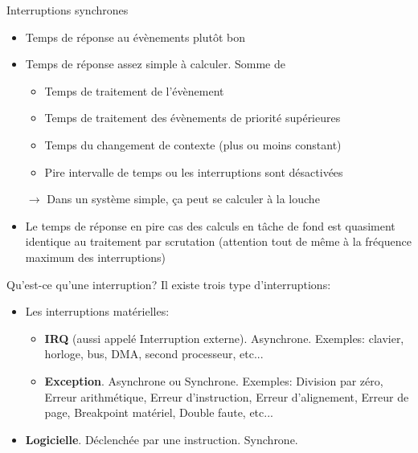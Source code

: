 \begin{frame}{Interruptions synchrones}
  \begin{itemize}
  \item Temps de réponse au évènements plutôt bon
  \item Temps de réponse assez simple à calculer. Somme de
    \begin{itemize}
    \item Temps de traitement de l'évènement
    \item Temps de traitement des évènements de priorité supérieures
    \item Temps du changement de contexte (plus ou moins constant)
    \item Pire intervalle de temps ou les interruptions sont désactivées
    \end{itemize}
  \item[$\rightarrow$] Dans  un système simple, ça peut  se calculer à
    la louche
  \item Le  temps de réponse en pire  cas des calculs en  tâche de fond
    est quasiment  identique au traitement  par scrutation (attention
    tout de même à la fréquence maximum des interruptions)
  \end{itemize}
\end{frame}

\begin{frame}{Qu'est-ce qu'une interruption?}
  Il existe trois type d'interruptions:
  \begin{itemize}
  \item Les interruptions matérielles:
    \begin{itemize}
    \item   \textbf{IRQ}   (aussi   appelé   Interruption   externe).
      Asynchrone.   Exemples:  clavier,   horloge,  bus,  DMA,  second
      processeur, etc...
    \item  \textbf{Exception}.   Asynchrone  ou Synchrone.   Exemples:
      Division  par zéro,  Erreur arithmétique,  Erreur d'instruction,
      Erreur d'alignement, Erreur de page, Breakpoint matériel, Double
      faute,  etc...


    \end{itemize}
  \item \textbf{Logicielle}. Déclenchée par une instruction. Synchrone.
  \end{itemize}
\end{frame}

